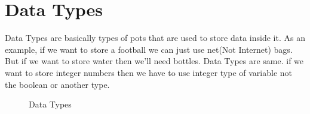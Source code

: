 \documentclass[openany]{book}  %
\begin{document}
\section{Data Types}
Data Types\cite{Ref6} are basically types of pots that are used to store data inside it. As an example, if we want to store a football we can just use net(Not Internet) bags.
But if we want to store water then we'll need bottles. Data Types are same. if we want to store integer numbers then we have to use integer type of variable not the boolean or another type.
% 
% 
\begin{figure}[htbp]
    \begin{center}
        \caption{Data Types\cite{Ref6}}
    \end{center}
\end{figure}
% 
% 
\end{document}
